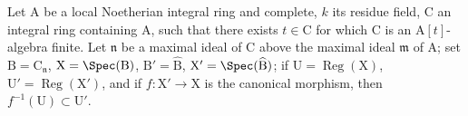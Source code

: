 \begin{lemma}[7.4.4.2]
\label{IV.7.4.4.2}
Let $\mathrm{A}$ be a local Noetherian integral ring and complete, $k$ its residue field, $\mathrm{C}$ an integral ring containing $\mathrm{A}$, such that there exists $t\in\mathrm{C}$ for which $\mathrm{C}$ is an $\mathrm{A}[t]$-algebra finite.
Let $\mathfrak{n}$ be a maximal ideal of $\mathrm{C}$ above the maximal ideal $\mathfrak{m}$ of $\mathrm{A}$; set $\mathrm{B}=\mathrm{C}_\mathfrak{n}$, $\mathrm{X}=\Spec(\mathrm{B})$, $\mathrm{B}'=\widehat{\mathrm{B}}$, $\mathrm{X}'=\Spec(\widehat{\mathrm{B}})$; if $\mathrm{U}=\operatorname{Reg}(\mathrm{X})$, $\mathrm{U}'=\operatorname{Reg}(\mathrm{X}')$, and if $f:\mathrm{X}'\to\mathrm{X}$ is the canonical morphism, then $f^{-1}(\mathrm{U})\subset\mathrm{U}'$.
\end{lemma}

